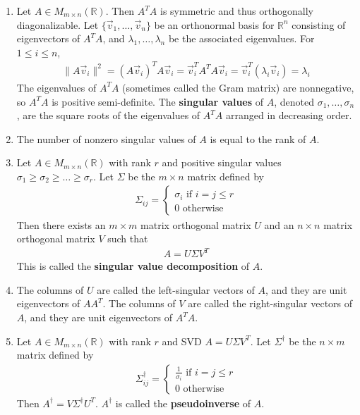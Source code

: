 \documentclass[10pt]{article}
\begin{document}
\begin{multicols*}{2}
\begin{enumerate}
\begin{enumerate}
        \item Let $A \in M_{m \times n}(\mathbb{R})$. Then $A^TA$ is symmetric and thus orthogonally diagonalizable. Let $\{ \vec{v}_1, \hdots, \vec{v}_n \}$ be an orthonormal basis for $\mathbb{R}^n$ consisting of eigenvectors of $A^TA$, and $\lambda_1, \hdots, \lambda_n$ be the associated eigenvalues. For $1 \leq i \leq n$,
        \begin{align*}
            \| A\vec{v}_i \|^2 = (A\vec{v}_i)^T A\vec{v}_i = \vec{v}_i^T A^TA \vec{v}_i = \vec{v}_i^T (\lambda_i \vec{v}_i) = \lambda_i
        \end{align*}
        The eigenvalues of $A^TA$ (sometimes called the Gram matrix) are nonnegative, so $A^TA$ is positive semi-definite. The \textbf{singular values} of $A$, denoted $\sigma_1, \hdots, \sigma_n$,  are the square roots of the eigenvalues of $A^TA$ arranged in decreasing order.
        \item The number of nonzero singular values of $A$ is equal to the rank of $A$.
        \item Let $A \in M_{m \times n}(\mathbb{R})$ with rank $r$ and positive singular values $\sigma_1 \geq \sigma_2 \geq \hdots \geq \sigma_r$. Let $\Sigma$ be the $m \times n$ matrix defined by
        \begin{align*}
            \Sigma_{ij} = 
                \left\{
                \begin{array}{ll}
                  \sigma_i \text{ if $i=j \leq r$} \\
                  0 \text{ otherwise}
                \end{array}
                \right.
        \end{align*}
        Then there exists an $m \times m$ matrix orthogonal matrix $U$ and an $n \times n$ matrix orthogonal matrix $V$ such that
        \begin{align*}
            A = U \Sigma V^T
        \end{align*}
        This is called the \textbf{singular value decomposition} of $A$.
        \item The columns of $U$ are called the left-singular vectors of $A$, and they are unit eigenvectors of $AA^T$. The columns of $V$ are called the right-singular vectors of $A$, and they are unit eigenvectors of $A^TA$.
        \item Let $A \in M_{m \times n}(\mathbb{R})$ with rank $r$ and SVD $A=U\Sigma V^T$. Let $\Sigma^\dagger$ be the $n \times m$ matrix defined by
        \begin{align*}
            \Sigma_{ij}^\dagger = 
                \left\{
                \begin{array}{ll}
                  \frac{1}{\sigma_i} \text{ if $i=j \leq r$} \\
                  0 \text{ otherwise}
                \end{array}
                \right.
        \end{align*}
        Then $A^\dagger = V \Sigma^\dagger U^T$. $A^\dagger$ is called the \textbf{pseudoinverse} of $A$.
        

\end{enumerate}
\end{enumerate}
\end{multicols*}
\end{document}
